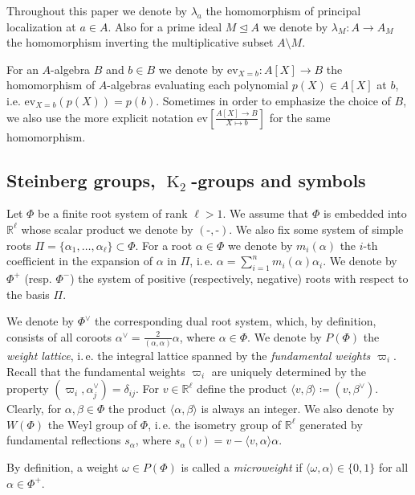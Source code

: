 \documentclass[oneside, 10pt]{amsart}
\DeclareMathOperator{\K}{K}
\newcommand{\eval}[4]{\mathrm{ev} \textstyle \left[\frac{#2[#1] \rightarrow #3}{#1 \mapsto #4}\right]}
\newcommand{\ev}[3]{\eval{X}{#1}{#2}{#3}}
\numberwithin{equation}{section}
\numberwithin{thm}{section}
\numberwithin{lemma}{section}
\theoremstyle{definition}
\theoremstyle{remark}
\begin{document}
Throughout this paper we denote by $\lambda_a$ the homomorphism of principal localization at $a \in A$.
Also for a prime ideal $M \trianglelefteq A$ we denote by $\lambda_M \colon A \to A_M$ the homomorphism inverting the multiplicative subset $A \setminus M$.

For an $A$-algebra $B$ and $b\in B$ we denote by $\mathrm{ev}_{X=b} \colon A[X]\rightarrow B$ the homomorphism of $A$-algebras evaluating each polynomial
$p(X)\in A[X]$ at $b$, i.e. $\mathrm{ev}_{X=b}(p(X)) = p(b)$.
Sometimes in order to emphasize the choice of $B$, we also use the more explicit notation $\ev{A}{B}{b}$ for the same homomorphism.

\subsection{Steinberg groups, \texorpdfstring{$\K_2$}{K₂}-groups and symbols}\label{subsec:steinberg-preliminaries}
Let $\Phi$ be a finite root system of rank $\ell > 1$.
We assume that $\Phi$ is embedded into $\mathbb{R}^\ell$ whose scalar product we denote by $(\text{-}, \text{-})$.
We also fix some system of simple roots $\Pi = \{\alpha_1, \ldots, \alpha_\ell\} \subset \Phi$.
For a root $\alpha\in\Phi$ we denote by $m_i(\alpha)$ the $i$-th coefficient in the expansion of $\alpha$ in $\Pi$,
i.\,e. $\alpha = \sum_{i=1}^n m_i(\alpha) \alpha_i$.
We denote by $\Phi^+$ (resp. $\Phi^-$) the system of positive (respectively, negative) roots with respect to the basis $\Pi$.

We denote by $\Phi^\vee$ the corresponding dual root system, which, by definition, consists of all coroots $\alpha^\vee = \frac{2}{(\alpha, \alpha)} \alpha$, where $\alpha \in \Phi$.
We denote by $P(\Phi)$ the \textit{weight lattice}, i.\,e. the integral lattice spanned by the \emph{fundamental weights $\varpi_i$}.
Recall that the fundamental weights $\varpi_i$ are uniquely determined by the property $(\varpi_i, \alpha_j^\vee) = \delta_{ij}$.
For $v \in \mathbb{R}^\ell$ define the product $\langle v, \beta \rangle \coloneqq (v, \beta^\vee).$
Clearly, for $\alpha,\beta \in \Phi$ the product $\langle \alpha, \beta\rangle$ is always an integer.
We also denote by $W(\Phi)$ the Weyl group of $\Phi$, i.\,e. the isometry group of $\mathbb{R}^\ell$ generated by fundamental reflections $s_\alpha$,
where $s_\alpha(v) = v - \langle v, \alpha\rangle \alpha$.

By definition, a weight $\omega \in P(\Phi)$ is called a \textit{microweight} if $\langle \omega, \alpha \rangle \in \{ 0, 1 \}$ for all $\alpha \in \Phi^+$.
\end{document}
